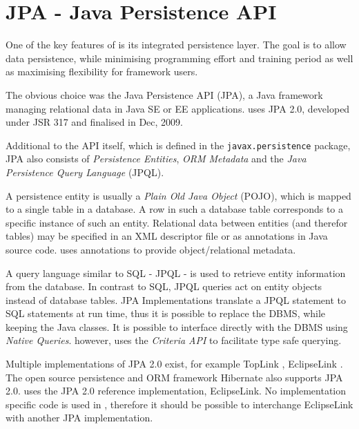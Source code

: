 \section{JPA - Java Persistence API}
One of the key features of \salespoint is its integrated persistence layer. The goal is to allow data persistence, while minimising programming effort and training period as well as maximising flexibility for framework users.

The obvious choice was the Java Persistence API (JPA), a Java framework managing relational data in Java SE or EE applications. \salespoint uses JPA 2.0, developed under JSR 317 and finalised in Dec, 2009.

Additional to the API itself, which is defined in the \texttt{javax.persistence} package, JPA also consists of \textit{Persistence Entities}, \textit{ORM Metadata} and the \textit{Java Persistence Query Language} (JPQL).

A persistence entity is usually a \textit{Plain Old Java Object} (POJO), which is mapped to a single table in a database.
A row in such a database table corresponds to a specific instance of such an entity.
Relational data between entities (and therefor tables) may be specified in an XML descriptor file or as annotations in Java source code.
\salespoint{} uses annotations to provide object/relational metadata.

A query language similar to SQL - JPQL - is used to retrieve entity information from the database.
In contrast to SQL, JPQL queries act on entity objects instead of database tables.
JPA Implementations translate a JPQL statement to SQL statements at run time, thus it is possible to replace the DBMS, while keeping the Java classes.
It is possible to interface directly with the DBMS using \textit{Native Queries}.
\salespoint{} however, uses the \textit{Criteria API} to facilitate type safe querying.

Multiple implementations of JPA 2.0 exist, for example TopLink \cite{toplink}, EclipseLink \cite{eclipselink}.
The open source persistence and ORM framework Hibernate \cite{hibernate} also supports JPA 2.0.
\salespoint uses the JPA 2.0 reference implementation, EclipseLink.
No implementation specific code is used in \salespoint, therefore it should be possible to interchange EclipseLink with another JPA implementation.
